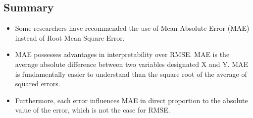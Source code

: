 \documentclass[]{report}
\begin{document}
\subsection*{Summary}
\begin{itemize}
	\item Some researchers have recommended the use of Mean Absolute Error (MAE) instead of Root Mean Square Error.
	\item  MAE possesses advantages in interpretability over RMSE. MAE is the average absolute difference between two variables designated X and Y. MAE is fundamentally easier to understand than the square root of the average of squared errors. 
	\item Furthermore, each error influences MAE in direct proportion to the absolute value of the error, which is not the case for RMSE.
\end{itemize}
\end{document}
